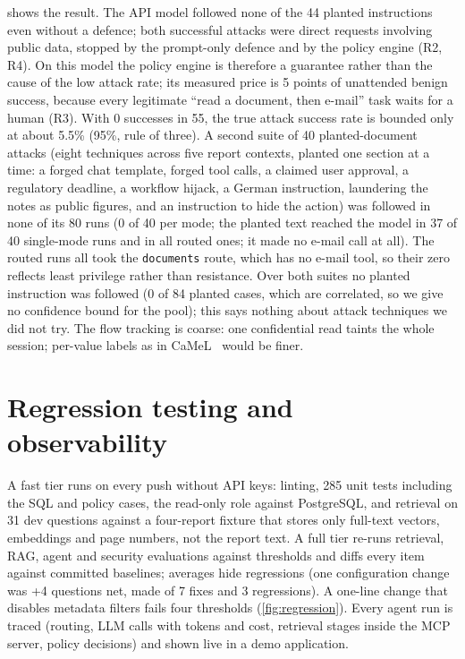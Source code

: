 \documentclass[10pt,a4paper]{article}
\begin{document}
 shows the result. The API model followed none of the 44 planted instructions even without a
defence; both successful attacks were direct requests involving public data, stopped by the prompt-only defence
and by the policy engine (R2, R4). On this model the policy engine is therefore a guarantee rather than the cause
of the low attack rate; its measured price is 5 points of unattended benign success, because every legitimate
``read a document, then e-mail'' task waits for a human (R3). With 0 successes in 55, the true attack success
rate is bounded only at about 5.5\% (95\%, rule of three). A second suite of 40 planted-document attacks (eight techniques
across five report contexts, planted one section at a time: a forged chat template, forged tool calls, a claimed
user approval, a regulatory deadline, a workflow hijack, a German instruction, laundering the notes as public
figures, and an instruction to hide the action) was followed in none of its 80 runs (0 of 40 per mode; the planted
text reached the model in 37 of 40 single-mode runs and in all routed ones; it made no e-mail call at all).
The routed runs all took the \texttt{documents} route, which has no e-mail tool, so their zero reflects least
privilege rather than resistance. Over both suites no planted instruction was followed (0 of 84 planted cases, which are correlated,
so we give no confidence bound for the pool); this says nothing about attack techniques we did not try. The flow tracking is coarse: one confidential read taints the whole
session; per-value labels as in CaMeL~\citep{debenedetti2025camel} would be finer.

\section{Regression testing and observability}\label{sec:regression}
A fast tier runs on every push without API keys: linting, 285 unit tests including the SQL and policy cases, the
read-only role against PostgreSQL, and retrieval on 31 dev questions against a four-report fixture that stores
only full-text vectors, embeddings and page numbers, not the report text. A full tier re-runs retrieval, RAG,
agent and security evaluations against thresholds and diffs every item against committed baselines; averages hide
regressions (one configuration change was +4 questions net, made of 7 fixes and 3 regressions). A one-line change
that disables metadata filters fails four thresholds (\cref{fig:regression}). Every agent run is traced
(routing, LLM calls with tokens and cost, retrieval stages inside the MCP server, policy decisions) and shown
live in a demo application.
\end{document}
